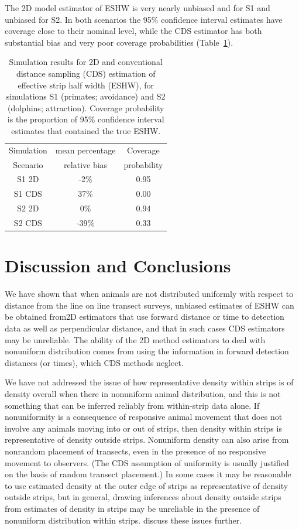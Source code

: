 \documentclass[useAMS,usenatbib,referee]{biom}
\begin{document}
The 2D model estimator of ESHW is very nearly unbiased and for S1 and unbiased for S2.  In both scenarios the 95\% confidence interval estimates have coverage close to their nominal level, while the CDS estimator has both substantial bias and very poor coverage probabilities (Table~\ref{tab:simResults}). 

\begin{table}[ht]
\caption{Simulation results for 2D and conventional distance sampling (CDS) estimation of effective strip half width (ESHW), for simulations S1 (primates; avoidance) and S2 (dolphins; attraction). Coverage probability is the proportion of 95\% confidence interval estimates that contained the true ESHW.} \label{tab:simResults}
\begin{tabular}{ccc}
  \hline
Simulation & mean percentage  & Coverage \\ 
Scenario  & relative bias & probability \\
  \hline
S1 2D  &  -2\% & 0.95 \\ 
S1 CDS &  37\% & 0.00 \\ 
S2 2D  &   0\% & 0.94 \\ 
S2 CDS & -39\% & 0.33 \\ 
   \hline
\end{tabular}
\end{table}



\section{Discussion and Conclusions}

We have shown that when animals are not distributed uniformly with respect to distance from the line on line transect surveys, unbiased estimates of ESHW can be obtained from2D estimators that use forward distance or time to detection data as well as perpendicular distance, and that in such cases CDS estimators may be unreliable. The ability of the 2D method estimators to deal with nonuniform distribution comes from using the information in forward detection distances (or times), which CDS methods neglect. 

We have not addressed the issue of how representative density within strips is of density overall when there in nonuniform animal distribution, and this is not something that can be inferred reliably from within-strip data alone. If nonuniformity is a consequence of responsive animal movement that does not involve any animals moving into or out of strips, then density within strips is representative of density outside strips. Nonuniform density can also arise from nonrandom placement of transects, even in the presence of no responsive movement to observers. (The CDS assumption of uniformity is usually justified on the basis of random transect placement.) In some cases it may be reasonable to use estimated density at the outer edge of strips as representative of density outside strips, but in general, drawing inferences about density outside strips from estimates of density in strips may be unreliable in the presence of nonuniform distribution within strips. \cite{Marques+al:10a} discuss these issues further.
\end{document}
